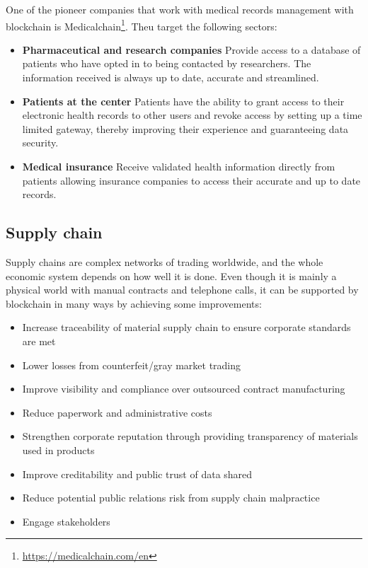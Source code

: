 \documentclass[10pt]{article}
\begin{document}
\begin{multicols}{2}
One of the pioneer companies that work with medical records management with blockchain is Medicalchain\footnote{\url{https://medicalchain.com/en}}. Theu target the following sectors:

\begin{itemize}
	\item \textbf{Pharmaceutical and research companies} Provide access to a database of patients who have opted in to being contacted by researchers. The information received is always up to date, accurate and streamlined.
	\item \textbf{Patients at the center} Patients have the ability to grant access to their electronic health records to other users and revoke access by setting up a time limited gateway, thereby improving their experience and guaranteeing data security.
	\item \textbf{Medical insurance} Receive validated health information directly from patients allowing insurance companies to access their accurate and up to date records.
\end{itemize}

\subsection{Supply chain}

Supply chains are complex networks of trading worldwide, and the whole economic system depends on how well it is done. Even though it is mainly a physical world with manual contracts and telephone calls, it can be supported by blockchain in many ways by achieving some improvements:

\begin{itemize}
	\item Increase traceability of material supply chain to ensure corporate standards are met
	\item Lower losses from counterfeit/gray market trading
	\item Improve visibility and compliance over outsourced contract manufacturing
	\item Reduce paperwork and administrative costs
	\item Strengthen corporate reputation through providing transparency of materials used in products
	\item Improve creditability and public trust of data shared
	\item Reduce potential public relations risk from supply chain malpractice
	\item Engage stakeholders
\end{itemize}


\end{multicols}
\end{document}
